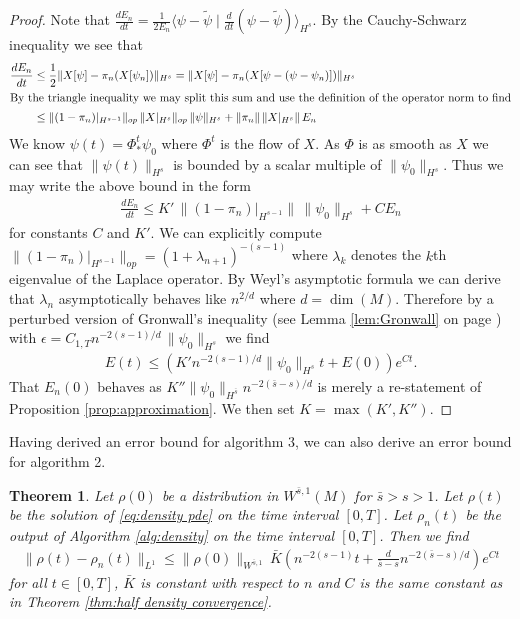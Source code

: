 \documentclass[12pt]{amsart}
\newtheorem{thm}{Theorem}[section]
\begin{document}
\begin{proof}
	Note that $\frac{dE_{n}}{dt} = \frac{1}{2E_{n}} \langle  \psi - \tilde{\psi} \mid \frac{d}{dt} ( \psi -\tilde{\psi} )\rangle_{H^{s}}$.
	By the Cauchy-Schwarz inequality we see that
	\begin{align}
		\frac{dE_{n}}{dt} &\leq  \frac{1}{2} \| X[\psi] - \pi_{n}(X[\psi_{n}]) \|_{H^{s}} = \| X[\psi] - \pi_{n}( X[\psi- (\psi-\psi_{n})]) \|_{H^{s}} \\
	\intertext{By the triangle inequality we may split this sum and use the definition of the operator norm to find}
		&\leq \| (1-\pi_{n})|_{H^{s-1}} \|_{op} \, \|X|_{H^{s}} \|_{op} \, \| \psi \|_{H^{s}} + \| \pi_{n} \| \, \|X|_{H^{s}} \| \, E_{n} \\
	\end{align}
	We know $\psi(t) = \Phi^{t}_{*}\psi_{0}$ where $\Phi^{t}$ is the flow of $X$.
	As $\Phi$ is as smooth as $X$ we can see that $\| \psi(t) \|_{H^{s}}$ is bounded by a scalar multiple of $\| \psi_{0} \|_{H^{s}}$.
	Thus we may write the above bound in the form
	\begin{align}
		\frac{dE_{n}}{dt} \leq K' \, \| (1- \pi_{n})|_{H^{s-1}} \| \, \| \psi_{0}\|_{H^{s}}+ C E_{n}
	\end{align}
	for constants $C$ and $K'$.
	We can explicitly compute $\| (1-\pi_{n})|_{H^{s-1}} \|_{op} = (1+\lambda_{n+1})^{-(s-1)}$ where $\lambda_{k}$ denotes the $k$th eigenvalue of the Laplace operator.
	By Weyl's asymptotic formula \cite[Theorem B.2]{Chavel1984} we
	can derive that $\lambda_{n}$ asymptotically behaves like $n^{2/d}$ where $d = \dim(M)$.
	Therefore by a perturbed version of Gronwall's inequality (see Lemma \ref{lem:Gronwall} on page \pageref{lem:Gronwall}) with $\epsilon = C_{1,T} n^{-2(s-1) / d} \, \| \psi_{0}\|_{H^{s}}$
	we find
	\begin{align}
		E(t) \leq ( K' n^{-2(s-1) / d} \| \psi_{0} \|_{H^{s}} t+  E(0) ) e^{C t}.
	\end{align}
	That $E_{n}(0)$ behaves as $K'' \| \psi_{0} \|_{H^{\bar{s}}} n^{-2(\bar{s}-s)/d}$ is merely a re-statement of Proposition \ref{prop:approximation}.
	We then set $K = \max(K', K'')$.
\end{proof}

Having derived an error bound for algorithm 3, we can also derive an error bound for algorithm 2.

\begin{thm} \label{thm:density convergence}
	Let $\rho(0)$ be a distribution in $W^{\bar{s},1}(M)$ for $\bar{s} > s >1$.
	Let $\rho(t)$ be the solution of \eqref{eq:density pde} on the time interval $[0,T]$.
	Let $\rho_{n}(t)$ be the output of Algorithm \ref{alg:density} on the time interval $[0,T]$.
	Then we find
	\begin{align}
		\| \rho(t) - \rho_{n}(t) \|_{L^{1}} \leq \| \rho(0) \|_{W^{\bar{s},1}} \, \bar{K} \left( n^{-2(s-1)} t+  \frac{d}{\bar{s}-s} n^{-2(\bar{s}-s)/d} \right) e^{C t}
	\end{align}
	for all $t \in [0,T]$, $\bar{K}$ is constant with respect to $n$ and $C$ is the same constant as in Theorem \ref{thm:half density convergence}.
\end{thm}
\end{document}
